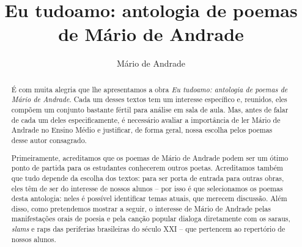 \documentclass[11pt]{extarticle}
\begin{document}
\newcommand{\AutorLivro}{Mário de Andrade}
\newcommand{\TituloLivro}{Eu tudoamo: antologia de poemas de Mário de Andrade}
\newcommand{\Tema}{Ficção, mistério e fantasia}
\newcommand{\Genero}{Poema}
\newcommand{\imagemCapa}{./images/PNLD0005-01.png}
\newcommand{\issnppub}{---}
\newcommand{\issnepub}{---}
\newcommand{\colaborador}{Carlos Rogério Duarte Barreiros}


\title{\TituloLivro}
\author{\AutorLivro}
\def\authornotes{\colaborador}

\date{}
\maketitle


\begin{abstract}

É com muita alegria que lhe apresentamos a obra \emph{Eu tudoamo: antologia de poemas de Mário de Andrade}. 
Cada um desses textos tem um
interesse específico e, reunidos, eles compõem um conjunto bastante
fértil para análise em sala de aula. Mas, antes de falar de cada um
deles especificamente, é necessário avaliar a importância de ler Mário
de Andrade no Ensino Médio e justificar, de forma geral, nossa escolha
pelos poemas desse autor consagrado.

Primeiramente, acreditamos que os poemas de Mário de Andrade podem ser
um ótimo ponto de partida para os estudantes conhecerem outros poetas.
Acreditamos também que tudo depende da escolha dos textos: para ser
porta de entrada para outras obras, eles têm de ser do interesse de
nossos alunos -- por isso é que selecionamos os poemas desta antologia:
neles é possível identificar temas atuais, que merecem discussão. Além
disso, como pretendemos mostrar a seguir, o interesse de Mário de
Andrade pelas manifestações orais de poesia e pela canção popular
dialoga diretamente com os saraus, \emph{slams} e raps das periferias
brasileiras do século XXI -- que pertencem ao repertório de nossos
alunos.


\end{abstract}
\end{document}
